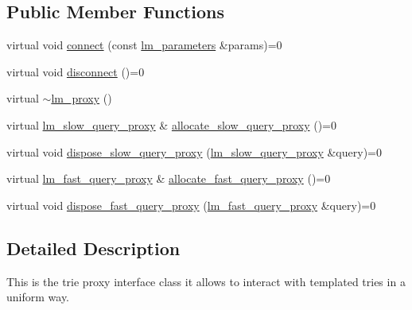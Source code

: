 \subsection*{Public Member Functions}
\begin{DoxyCompactItemize}
\item 
virtual void \hyperlink{classuva_1_1smt_1_1bpbd_1_1server_1_1lm_1_1proxy_1_1lm__proxy_a58ab183548efaa2fc5aa7081a7a5d174}{connect} (const \hyperlink{structuva_1_1smt_1_1bpbd_1_1server_1_1lm_1_1lm__parameters}{lm\+\_\+parameters} \&params)=0
\item 
virtual void \hyperlink{classuva_1_1smt_1_1bpbd_1_1server_1_1lm_1_1proxy_1_1lm__proxy_a0fd72b2586f75737dfa71e06d3a6c464}{disconnect} ()=0
\item 
virtual \hyperlink{classuva_1_1smt_1_1bpbd_1_1server_1_1lm_1_1proxy_1_1lm__proxy_a35c362a07c2346644db0733367cc9a3e}{$\sim$lm\+\_\+proxy} ()
\item 
virtual \hyperlink{classuva_1_1smt_1_1bpbd_1_1server_1_1lm_1_1proxy_1_1lm__slow__query__proxy}{lm\+\_\+slow\+\_\+query\+\_\+proxy} \& \hyperlink{classuva_1_1smt_1_1bpbd_1_1server_1_1lm_1_1proxy_1_1lm__proxy_aeda3274528221eeacd4d25d6355a4edb}{allocate\+\_\+slow\+\_\+query\+\_\+proxy} ()=0
\item 
virtual void \hyperlink{classuva_1_1smt_1_1bpbd_1_1server_1_1lm_1_1proxy_1_1lm__proxy_a6b1f23d2007cf4c44e812ac037ac8fe8}{dispose\+\_\+slow\+\_\+query\+\_\+proxy} (\hyperlink{classuva_1_1smt_1_1bpbd_1_1server_1_1lm_1_1proxy_1_1lm__slow__query__proxy}{lm\+\_\+slow\+\_\+query\+\_\+proxy} \&query)=0
\item 
virtual \hyperlink{classuva_1_1smt_1_1bpbd_1_1server_1_1lm_1_1proxy_1_1lm__fast__query__proxy}{lm\+\_\+fast\+\_\+query\+\_\+proxy} \& \hyperlink{classuva_1_1smt_1_1bpbd_1_1server_1_1lm_1_1proxy_1_1lm__proxy_a4562156dc6054b7cfb0a30119084a3ff}{allocate\+\_\+fast\+\_\+query\+\_\+proxy} ()=0
\item 
virtual void \hyperlink{classuva_1_1smt_1_1bpbd_1_1server_1_1lm_1_1proxy_1_1lm__proxy_ac9a6a51b9ca20e61f8297e85e470e4af}{dispose\+\_\+fast\+\_\+query\+\_\+proxy} (\hyperlink{classuva_1_1smt_1_1bpbd_1_1server_1_1lm_1_1proxy_1_1lm__fast__query__proxy}{lm\+\_\+fast\+\_\+query\+\_\+proxy} \&query)=0
\end{DoxyCompactItemize}


\subsection{Detailed Description}
This is the trie proxy interface class it allows to interact with templated tries in a uniform way. 

